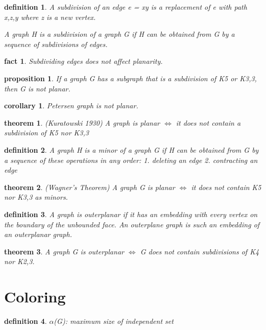 \documentclass[twocolumn]{article}
\newtheorem{theorem}{theorem}[section]  %
\newtheorem{definition}{definition}
\newtheorem{proposition}{proposition}
\newtheorem{corollary}{corollary}
\newtheorem{fact}{fact}
\begin{document}
\begin{CJK*}{UTF8}{bkai}
    \begin{definition}
        A subdivision of an edge e = xy is a replacement of e with path x,z,y where z
 is a new vertex.
 
 A graph H is a subdivision of a graph G if H can be obtained from G by a
 sequence of subdivisions of edges.
    \end{definition}

    \begin{fact}
        Subdividing edges does not affect planarity.
    \end{fact}

    \begin{proposition}
         If a graph G has a subgraph that is a subdivision of K5 or K3,3, then G is not
 planar.
    \end{proposition}

    \begin{corollary}
        Petersen graph is not planar.
    \end{corollary}

    \begin{theorem}{(Kuratowski 1930)}
         A graph is planar $\iff$ it does not contain a subdivision of K5 nor K3,3
    \end{theorem}

    \begin{definition}
         A graph H is a minor of a graph G if H can be obtained from G by a
 sequence of these operations in any order:
 1. deleting an edge
 2. contracting an edge
    \end{definition}

    \begin{theorem}{(Wagner's Theorem)}
         A graph G is planar $\iff$ it does not contain K5 nor K3,3 as minors.
    \end{theorem}

    \begin{definition}
        A graph is outerplanar if it has an embedding with every vertex on the
 boundary of the unbounded face. An outerplane graph is such an embedding
 of an outerplanar graph.
    \end{definition}

    \begin{theorem}
         A graph G is outerplanar $\iff$ G does not contain subdivisions of K4 nor K2,3.
    \end{theorem}

\section{Coloring}
\begin{definition}
        $\alpha$(G): maximum size of independent set


\end{definition}
\end{CJK*}
\end{document}
